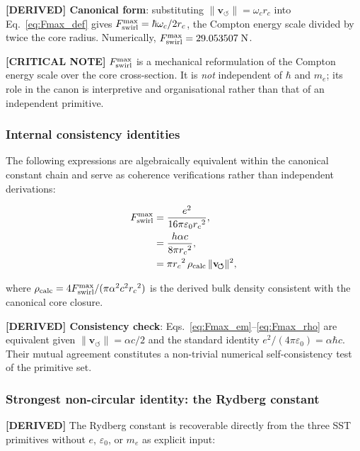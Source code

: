 \documentclass[11pt]{article}
\theoremstyle{definition}
\theoremstyle{plain}
\theoremstyle{remark}
\newcommand{\rc}{{r_c}}
\newcommand{\vnorm}{\lVert \mathbf{v}_{\!\boldsymbol{\circlearrowleft}} \rVert}
\begin{document}
        \textbf{[DERIVED] Canonical form}: substituting $\vnorm = \omega_c \rc$ into Eq.~\eqref{eq:Fmax_def} gives $F_{\rm swirl}^{\max} = \hbar\omega_c/2\rc$, the Compton energy scale divided by twice the core radius. Numerically, $F_{\rm swirl}^{\max} = 29.053507\;\text{N}$.

        \textbf{[CRITICAL NOTE]} $F_{\rm swirl}^{\max}$ is a mechanical reformulation of the Compton energy scale over the core cross-section. It is \emph{not} independent of $\hbar$ and $m_e$; its role in the canon is interpretive and organisational rather than that of an independent primitive.

        \subsubsection{Internal consistency identities}

        The following expressions are algebraically equivalent within the canonical constant chain and serve as coherence verifications rather than independent derivations:

        \begin{align}
            F_{\rm swirl}^{\max}
            &= \frac{e^2}{16\pi\varepsilon_0 \rc^2},
            \label{eq:Fmax_em}\\
            &= \frac{h\alpha c}{8\pi \rc^2},
            \label{eq:Fmax_hac}\\
            &= \pi \rc^2\,\rho_{\rm calc}\,\vnorm^2,
            \label{eq:Fmax_rho}
        \end{align}

        where $\rho_{\rm calc} = 4F_{\rm swirl}^{\max}/(\pi\alpha^2 c^2 \rc^2)$ is the derived bulk density consistent with the canonical core closure.

        \textbf{[DERIVED] Consistency check}: Eqs.~\eqref{eq:Fmax_em}--\eqref{eq:Fmax_rho} are equivalent given $\vnorm = \alpha c/2$ and the standard identity $e^2/(4\pi\varepsilon_0) = \alpha\hbar c$. Their mutual agreement constitutes a non-trivial numerical self-consistency test of the primitive set.

        \subsubsection{Strongest non-circular identity: the Rydberg constant}

        \textbf{[DERIVED]} The Rydberg constant is recoverable directly from the three SST primitives without $e$, $\varepsilon_0$, or $m_e$ as explicit input:
\end{document}
